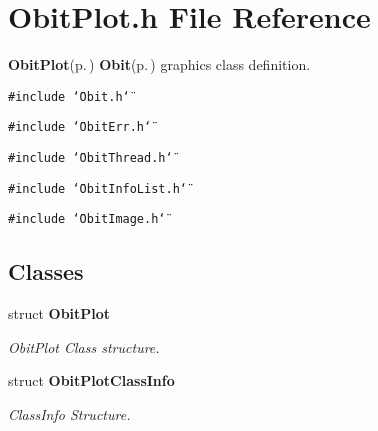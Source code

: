 \section{Obit\-Plot.h File Reference}
\label{ObitPlot_8h}
{\bf Obit\-Plot}{\rm (p.\,\pageref{structObitPlot})} {\bf Obit}{\rm (p.\,\pageref{structObit})} graphics class definition. 

{\tt \#include \char`\"{}Obit.h\char`\"{}}\par
{\tt \#include \char`\"{}Obit\-Err.h\char`\"{}}\par
{\tt \#include \char`\"{}Obit\-Thread.h\char`\"{}}\par
{\tt \#include \char`\"{}Obit\-Info\-List.h\char`\"{}}\par
{\tt \#include \char`\"{}Obit\-Image.h\char`\"{}}\par
\subsection*{Classes}
\begin{CompactItemize}
\item 
struct {\bf Obit\-Plot}
\begin{CompactList}\small\item\em Obit\-Plot Class structure. \item\end{CompactList}\item 
struct {\bf Obit\-Plot\-Class\-Info}
\begin{CompactList}\small\item\em Class\-Info Structure. \item\end{CompactList}\end{CompactItemize}
